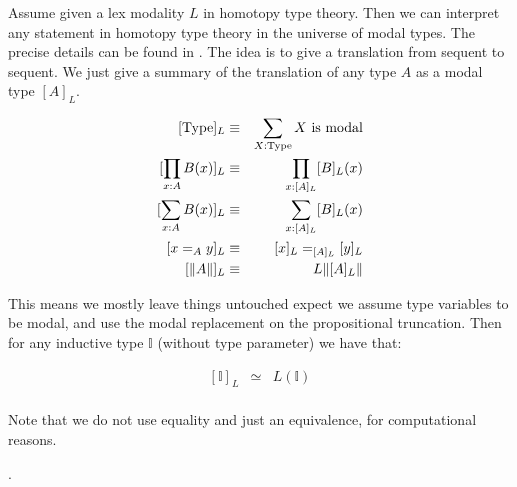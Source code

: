 Assume given a lex modality $L$ in homotopy type theory. Then we can interpret any statement in homotopy type theory in the universe of modal types. The precise details can be found in . The idea is to give a translation from sequent to sequent. We just give a summary of the translation of any type $A$ as a modal type $[A]_L$.

\begin{eqnarray}
{[\mathrm{Type}]_L} &\equiv& \sum_{X:\mathrm{Type}} X\ \mathrm{is\ modal}\\
{[\prod_{x:A}B(x)]_L} &\equiv& \prod_{x:[A]_L}[B]_L(x)\\
{[\sum_{x:A}B(x)]_L} &\equiv& \sum_{x:[A]_L}[B]_L(x)\\
{[x=_Ay]_L} &\equiv& [x]_L=_{[A]_L}[y]_L\\
{[\propTrunc{A}]_L} &\equiv& L\propTrunc{[A]_L}
\end{eqnarray}

This means we mostly leave things untouched expect we assume type variables to be modal, and use the modal replacement on the propositional truncation. Then for any inductive type $\mathbb{I}$ (without type parameter) we have that:

\begin{eqnarray}
{[\mathbb{I}]_L} &\simeq& L(\mathbb{I})\\
\end{eqnarray}

Note that we do not use equality and just an equivalence, for computational reasons.

.

